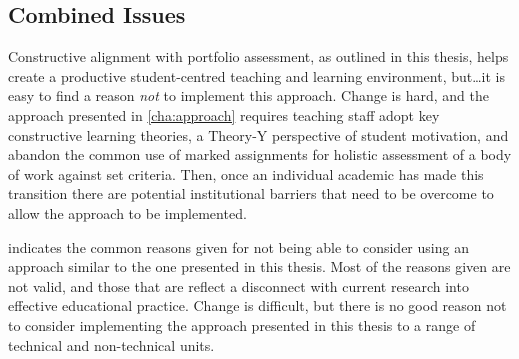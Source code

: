 \subsection{Combined Issues} %
\label{sub:combined_issues}

Constructive alignment with portfolio assessment, as outlined in this thesis, helps create a productive student-centred teaching and learning environment, but\ldots it is easy to find a reason \emph{not} to implement this approach. Change is hard, and the approach presented in \cref{cha:approach} requires teaching staff adopt key constructive learning theories, a Theory-Y perspective of student motivation, and abandon the common use of marked assignments for holistic assessment of a body of work against set criteria. Then, once an individual academic has made this transition there are potential institutional barriers that need to be overcome to allow the approach to be implemented. 

 indicates the common reasons given for not being able to consider using an approach similar to the one presented in this thesis. Most of the reasons given are not valid, and those that are reflect a disconnect with current research into effective educational practice. Change is difficult, but there is no good reason not to consider implementing the approach presented in this thesis to a range of technical and non-technical units.

